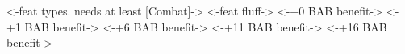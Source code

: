 { <-feat types. needs at least [Combat]-> }
{ <-feat fluff-> }
{ <-+0 BAB benefit-> }
{ <-+1 BAB benefit-> }
{ <-+6 BAB benefit-> }
{ <-+11 BAB benefit-> }
{ <-+16 BAB benefit-> }